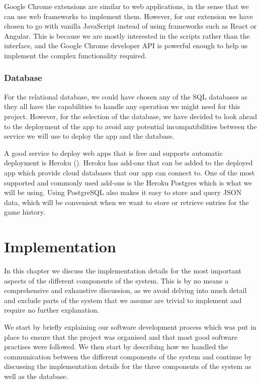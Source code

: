 \documentclass{l4proj}
\begin{document}
Google Chrome extensions are similar to web applications, in the sense that we can use web frameworks to implement them. However, for our extension we have chosen to go with vanilla JavaScript instead of using frameworks such as React or Angular.
This is because we are mostly interested in the scripts rather than the interface, and the Google Chrome developer API is powerful enough to help us implement the complex functionality required.

\subsection{Database}
For the relational database, we could have chosen any of the SQL databases as they all have the capabilities to handle any operation we might need for this project. However, for the selection of the database, we have decided to look ahead to the deployment of the 
app to avoid any potential incompatibilities between the service we will use to deploy the app and the database. 

A good service to deploy web apps that is free and supports automatic deployment is Heroku (\cite{heroku}). Heroku has add-ons that can be added to the deployed app which provide cloud databases that
our app can connect to. One of the most supported and commonly used add-ons is the Heroku Postgres which is what we will be using. Using PostgreSQL also makes it easy to store and query JSON data, which will be convenient when we want to store or retrieve entries for the game history.

\chapter{Implementation}
\label{implementation}

In this chapter we discuss the implementation details for the most important aspects of the different components of the system. This is by no means a comprehensive and exhaustive discussion, as we avoid delving into much detail and exclude parts of the system that we assume are trivial to implement and require no further explanation. 

We start by briefly explaining our software development process which was put in place to ensure that the project was organised and that most good software practises were followed. We then start by describing how we handled the communication between the different components of the system and continue by discussing the implementation details for the three components of the system as well as the database.
\end{document}

